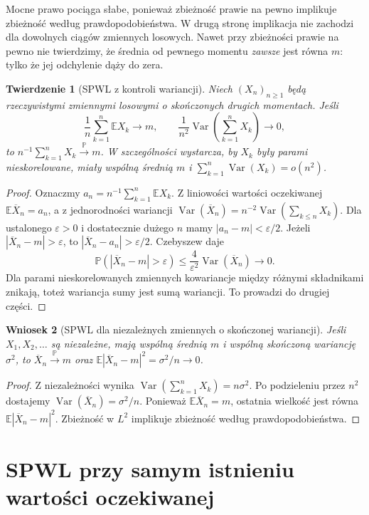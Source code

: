 \documentclass[11pt,a4paper,oneside]{report}
\numberwithin{equation}{chapter}
\theoremstyle{plain}
\newtheorem{twierdzenie}{Twierdzenie}[chapter]
\newtheorem{wniosek}[twierdzenie]{Wniosek}
\theoremstyle{definition}
\theoremstyle{remark}
\newcommand{\Prob}{\mathbb{P}}
\newcommand{\E}{\mathbb{E}}
\newcommand{\Var}{\operatorname{Var}}
\begin{document}
Mocne prawo pociąga słabe, ponieważ zbieżność prawie na
pewno implikuje zbieżność według prawdopodobieństwa.
W drugą stronę implikacja nie zachodzi dla dowolnych ciągów
zmiennych losowych. Nawet przy zbieżności prawie na pewno
nie twierdzimy, że średnia od pewnego momentu \emph{zawsze}
jest równa $m$: tylko że jej odchylenie dąży do zera.

\begin{twierdzenie}[SPWL z kontroli wariancji]
Niech $(X_n)_{n\geq1}$ będą rzeczywistymi zmiennymi losowymi
o skończonych drugich momentach. Jeśli
\[
\frac1n\sum_{k=1}^n\E X_k\longrightarrow m,
\qquad
\frac1{n^2}\Var\!\left(\sum_{k=1}^nX_k\right)\longrightarrow0,
\]
to $n^{-1}\sum_{k=1}^nX_k\xrightarrow{\Prob}m$.
W szczególności wystarcza, by $X_k$ były parami
nieskorelowane, miały wspólną średnią $m$ i
$\sum_{k=1}^n\Var(X_k)=o(n^2)$.
\end{twierdzenie}
\begin{proof}
Oznaczmy $a_n=n^{-1}\sum_{k=1}^n\E X_k$.
Z liniowości wartości oczekiwanej
$\E\overline X_n=a_n$, a z jednorodności wariancji
$\Var(\overline X_n)=n^{-2}\Var(\sum_{k\leq n}X_k)$.
Dla ustalonego $\varepsilon>0$ i dostatecznie
dużego $n$ mamy $|a_n-m|<\varepsilon/2$.
Jeżeli $|\overline X_n-m|>\varepsilon$, to
$|\overline X_n-a_n|>\varepsilon/2$. Czebyszew daje
\[
\Prob(|\overline X_n-m|>\varepsilon)
\leq\frac{4}{\varepsilon^2}\Var(\overline X_n)
\longrightarrow0.
\]
Dla parami nieskorelowanych zmiennych kowariancje
między różnymi składnikami znikają, toteż wariancja
sumy jest sumą wariancji. To prowadzi do drugiej części.
\end{proof}

\begin{wniosek}[SPWL dla niezależnych zmiennych o skończonej wariancji]
Jeśli $X_1,X_2,\ldots$ są niezależne, mają wspólną
średnią $m$ i wspólną skończoną wariancję $\sigma^2$,
to $\overline X_n\xrightarrow{\Prob}m$ oraz
$\E|\overline X_n-m|^2=\sigma^2/n\to0$.
\end{wniosek}
\begin{proof}
Z niezależności wynika
$\Var(\sum_{k=1}^nX_k)=n\sigma^2$.
Po podzieleniu przez $n^2$ dostajemy
$\Var(\overline X_n)=\sigma^2/n$.
Ponieważ $\E\overline X_n=m$, ostatnia wielkość
jest równa $\E|\overline X_n-m|^2$.
Zbieżność w $L^2$ implikuje zbieżność według
prawdopodobieństwa.
\end{proof}

\section{SPWL przy samym istnieniu wartości oczekiwanej}
\end{document}
